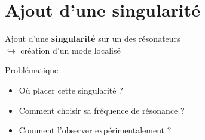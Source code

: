 \documentclass[12pt,xcolor=x11names,compress, notes=show]{beamer}%
\begin{document}
\section{Ajout d'une singularité}
\begin{frame}{\insertsectionhead}

	Ajout d'une \textbf{singularité} sur un des résonateurs\\
	  \hspace{1cm} $\hookrightarrow$ création d'un mode localisé \\

	\vspace{1cm}
	\begin{block}{Problématique}
		\begin{itemize}
			\item Où placer cette singularité ?
			\item Comment choisir sa fréquence de résonance ?
			\item Comment l'observer expérimentalement ?
		\end{itemize}
	\end{block}
 
\end{frame}
\end{document}
